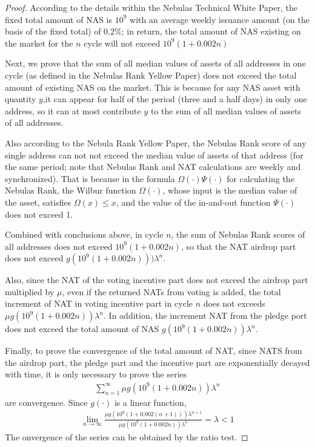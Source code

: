 \begin{proof}
	According to the details within the Nebulas Technical White Paper, the fixed total amount of NAS is $10^9$ with an average weekly issuance amount (on the basis of the fixed total) of $0.2\%$; in return, the total amount of NAS existing on the market for the $n$ cycle will not exceed $10^9 (1+0.002n) $

	Next, we prove that the sum of all median values of assets of all addresses in one cycle (as defined in the Nebulas Rank Yellow Paper) does not exceed the total amount of existing NAS on the market. This is because for any NAS asset with quantity $y$,it can appear for half of the period (three and a half days) in only one address, so it can at most contribute $y$ to the sum of all median values of assets of all addresses.

	Also according to the Nebula Rank Yellow Paper, the Nebulas Rank score of any
	single address can not not exceed the median value of assets of that address
	(for the same period; note that Nebulas Rank and NAT calculations are weekly
	and synchronized). That is because in the formula $\Omega(\cdot)\Psi(\cdot)$
	for calculating the Nebulas Rank, the Wilbur function $\Omega(\cdot)$, whose
	input is the median value of the asset, satisfies $\Omega (x) \leq x$, and
	the value of the in-and-out function $\Psi(\cdot)$ does not exceed 1.

	Combined with conclusions above, in cycle $n$, the sum of Nebulas Rank scores of all addresses does not exceed $10^9(1+0.002n)$, so that the NAT airdrop part does not exceed $g(10^9(1+0.002n)))\lambda^n$.

	Also, since the NAT of the voting incentive part does not exceed the airdrop part multiplied by $\mu$, even if the returned NATs from voting is added, the total increment of NAT in voting incentive part in cycle $n$ does not exceeds $\mu g(10^9( 1+0.002n))\lambda^n$. In addition, the increment NAT from the pledge port does not exceed the total amount of NAS $g (10^9(1+0.002n))\lambda^n$.

	Finally, to prove the convergence of the total amount of NAT, since NATS  from the airdrop part, the pledge part and the incentive part are exponentially decayed with time, it is only necessary to prove the series
	\begin{align}
	\sum_{n=1}^{\infty} \mu g(10^9(1+0.002n))\lambda^n
	\end{align}
    are	convergence. Since $g(\cdot)$ is a linear function,
	\begin{align}
	\lim_{n\rightarrow \infty} \frac{\mu g(10^9(1+0.002(n+1)))\lambda^{n+1}}{\mu g(10^9(1+ 0.002n))\lambda^n} = \lambda <1
	\end{align}
	The onvergence of the series can be obtained by the ratio test.
\end{proof}

